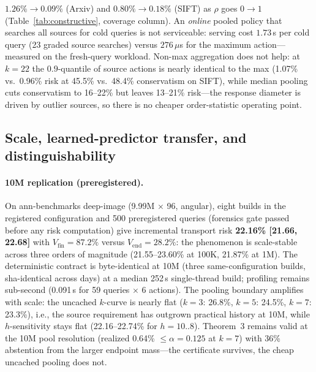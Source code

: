 \documentclass{article}
\begin{document}
$1.26\%\to0.09\%$ (Arxiv) and $0.80\%\to0.18\%$ (SIFT) as $\rho$ goes $0\to1$ (Table~\ref{tab:constructive},
coverage column). An \emph{online} pooled policy that searches all sources for cold queries is not
serviceable: serving cost $1.73$\,s per cold query (23 graded source searches) versus $276\,\mu$s for the
maximum action---measured on the fresh-query workload. Non-max aggregation does not help: at $k{=}22$ the $0.9$-quantile of source
actions is nearly identical to the max (1.07\% vs.\ 0.96\% risk at 45.5\% vs.\ 48.4\% conservatism on
SIFT), while median pooling cuts conservatism to 16--22\% but leaves 13--21\% risk---the response
diameter is driven by outlier sources, so there is no cheaper order-statistic operating point.

\subsection{Scale, learned-predictor transfer, and distinguishability}
\label{sec:scale}

\paragraph{10M replication (preregistered).}
On ann-benchmarks deep-image (9.99M $\times$ 96, angular), eight builds in the registered
configuration and 500 preregistered queries (forensics gate passed before any risk
computation) give incremental transport risk \textbf{22.16\% [21.66, 22.68]} with
$V_{\mathrm{fin}}{=}87.2\%$ versus $V_{\mathrm{end}}{=}28.2\%$: the phenomenon is
scale-stable across three orders of magnitude (21.55--23.60\% at 100K, 21.87\% at 1M).
The deterministic contract is byte-identical at 10M (three same-configuration builds,
sha-identical across days) at a median 252\,s single-thread build; profiling remains
sub-second (0.091\,s for 59 queries $\times$ 6 actions). The pooling boundary amplifies
with scale: the uncached $k$-curve is nearly flat ($k{=}3$: 26.8\%, $k{=}5$: 24.5\%, $k{=}7$:
23.3\%), i.e., the source requirement has outgrown practical history at 10M, while
$h$-sensitivity stays flat (22.16--22.74\% for $h{=}10{..}8$). Theorem~3 remains valid at the 10M
pool resolution (realized 0.64\% $\le\alpha{=}0.125$ at $k{=}7$) with 36\% abstention from the
larger endpoint mass---the certificate survives, the cheap uncached pooling does not.
\end{document}
